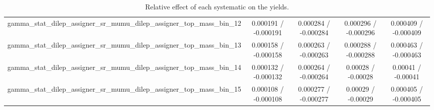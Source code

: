 \documentclass[10pt]{article}
\begin{document}
\begin{table}[htbp]
\begin{center}
\begin{tabular}{|c|c|c|c|c|}
  gamma_stat_dilep_assigner_sr_mumu_dilep_assigner_top_mass_bin_12 & 0.000191 / -0.000191 & 0.000284 / -0.000284 & 0.000296 / -0.000296 & 0.000409 / -0.000409 \\ 
  gamma_stat_dilep_assigner_sr_mumu_dilep_assigner_top_mass_bin_13 & 0.000158 / -0.000158 & 0.000263 / -0.000263 & 0.000288 / -0.000288 & 0.000463 / -0.000463 \\ 
  gamma_stat_dilep_assigner_sr_mumu_dilep_assigner_top_mass_bin_14 & 0.000132 / -0.000132 & 0.000264 / -0.000264 & 0.00028 / -0.00028 & 0.00041 / -0.00041 \\ 
  gamma_stat_dilep_assigner_sr_mumu_dilep_assigner_top_mass_bin_15 & 0.000108 / -0.000108 & 0.000277 / -0.000277 & 0.00029 / -0.00029 & 0.000405 / -0.000405 \\ 
\hline 
\end{tabular} 
\caption{Relative effect of each systematic on the yields.} 
\end{center} 
\end{table} 
\end{document}
